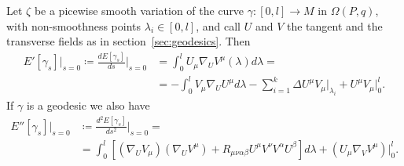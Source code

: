 \begin{lemma}
	Let \(\zeta\) be a picewise smooth variation of the curve \(\gamma: [0, l] \rightarrow M\)  in \(\Omega(P, q)\), with non-smoothness points \(\lambda_i \in [0, l]\), and call \(U\) and \(V\) the tangent and the transverse fields as in section~\ref{sec:geodesics}. Then
	\begin{align}
		E'[\gamma_s]\vert_{s = 0} \coloneqq \frac{dE[\gamma_s]}{ds}\Big\vert_{s = 0} &= 
		\int_{0}^{l} U_{\mu}\nabla_UV^{\mu}(\lambda) d\lambda = \\
		&= - \int_{0}^{l}  V_{\mu}\nabla_UU^{\mu}d\lambda - \sum_{i = 1}^{k} \Delta U^{\mu}V_{\mu}\Big\vert_{\lambda_i} + U^{\mu}V_{\mu}\Big\vert^l_0.
		\label{eq:first-E-var}
	\end{align}
	If \(\gamma\) is a geodesic we also have
	\begin{align}
		E''[\gamma_s]\vert_{s = 0} &\coloneqq \frac{d^2E[\gamma_s]}{ds^2}\Big\vert_{s = 0} = \\
		&= \int_{0}^{l} \left[(\nabla_UV_{\mu})(\nabla_UV^{\mu}) + R_{\mu\nu\alpha\beta}U^{\mu}V^{\nu}V^{\alpha}U^{\beta}\right] d\lambda + (U_{\mu}\nabla_VV^{\mu})\Big\vert_0^l.
		\label{eq:second-E-var}
	\end{align}
	
\end{lemma}

